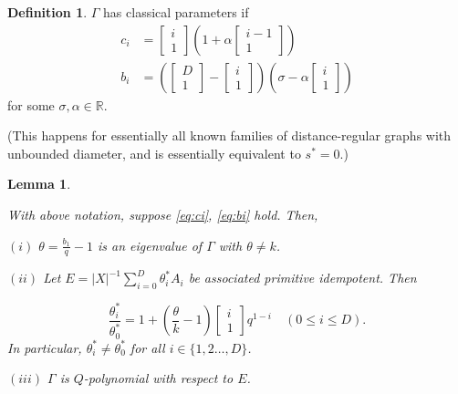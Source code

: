 \documentclass[
]{book}
\newtheorem{lemma}{Lemma}[chapter]
\theoremstyle{definition}
\newtheorem{definition}{Definition}[chapter]
\theoremstyle{definition}
\theoremstyle{definition}
\theoremstyle{definition}
\theoremstyle{remark}
\begin{document}
\begin{definition}
\protect\hypertarget{def:classical}{}\label{def:classical}\(\Gamma\) has classical parameters if
\begin{align}
c_i & = \begin{bmatrix}{i}\\{1}\end{bmatrix}\left(1+ \alpha \begin{bmatrix}{i-1}\\{1}\end{bmatrix}\right) \label{eq:ci}\\
b_i & = \left(\begin{bmatrix}{D}\\{1}\end{bmatrix}-\begin{bmatrix}{i}\\{1}\end{bmatrix}\right)\left(\sigma- \alpha \begin{bmatrix}{i}\\{1}\end{bmatrix}\right) \label{eq:bi}
\end{align}
for some \(\sigma, \alpha\in \mathbb{R}\).

(This happens for essentially all known families of distance-regular graphs with unbounded diameter, and is essentially equivalent to \(s^*=0\).)
\end{definition}

\begin{lemma}
\protect\hypertarget{lem:classical-parameters}{}\label{lem:classical-parameters}

With above notation, suppose \eqref{eq:ci}, \eqref{eq:bi} hold.
Then,

\((i)\) \(\theta = \frac{b_1}{q}-1\) is an eigenvalue of \(\Gamma\) with \(\theta\neq k\).

\((ii)\) Let \(E = |X|^{-1}\sum_{i=0}^D \theta^*_i A_i\) be associated primitive idempotent. Then

\[\frac{\theta^*_i}{\theta^*_0} = 1 + \left(\frac{\theta}{k}-1\right)\begin{bmatrix}{i}\\{1}\end{bmatrix} q^{1-i} \quad (0\leq i\leq D).\]
In particular, \(\theta^*_i \neq \theta^*_0\) for all \(i\in \{1, 2 \ldots, D\}\).

\((iii)\) \(\Gamma\) is \(Q\)-polynomial with respect to \(E\).

\end{lemma}
\end{document}
